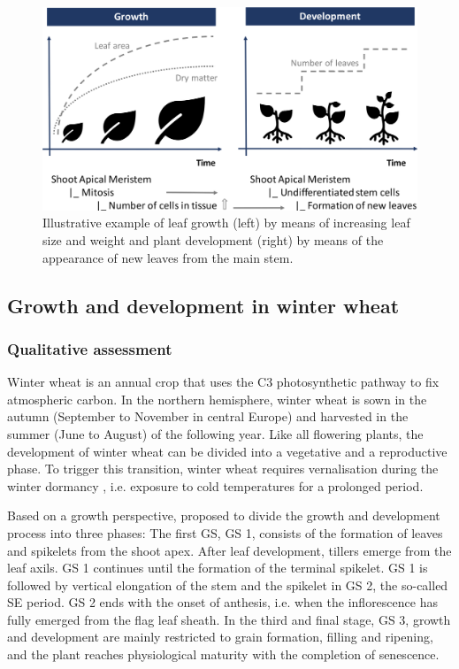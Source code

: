 \begin{figure}[H]
    \centering
    \includegraphics[width=\textwidth]{01-Introduction/img/growth_and_development.pdf}
    \caption{Illustrative example of leaf growth (left) by means of increasing leaf size and weight and plant development (right) by means of the appearance of new leaves from the main stem.}
    \label{fig:growth-development-biology}
\end{figure}

\subsection{Growth and development in winter wheat}
\subsubsection{Qualitative assessment}
\label{subsubsec:ww-qualitative-assessment}

Winter wheat is an annual crop that uses the C3 photosynthetic pathway to fix atmospheric carbon. In the northern hemisphere, winter wheat is sown in the autumn (September to November in central Europe) and harvested in the summer (June to August) of the following year. Like all flowering plants, the development of winter wheat can be divided into a vegetative and a reproductive phase. To trigger this transition, winter wheat requires vernalisation during the winter dormancy \citep{fedorov_photoperiodism_1976}, i.e. exposure to cold temperatures for a prolonged period.

Based on a growth perspective, \cite{kirby_analysis_1988} proposed to divide the growth and development process into three phases: The first \gls{GS}, \gls{GS} 1, consists of the formation of leaves and spikelets from the shoot apex. After leaf development, tillers emerge from the leaf axils. \gls{GS} 1 continues until the formation of the terminal spikelet. \gls{GS} 1 is followed by vertical elongation of the stem and the spikelet in \gls{GS} 2, the so-called \gls{SE} period. \gls{GS} 2 ends with the onset of anthesis, i.e. when the inflorescence has fully emerged from the flag leaf sheath. In the third and final stage, \gls{GS} 3, growth and development are mainly restricted to grain formation, filling and ripening, and the plant reaches physiological maturity with the completion of senescence.

